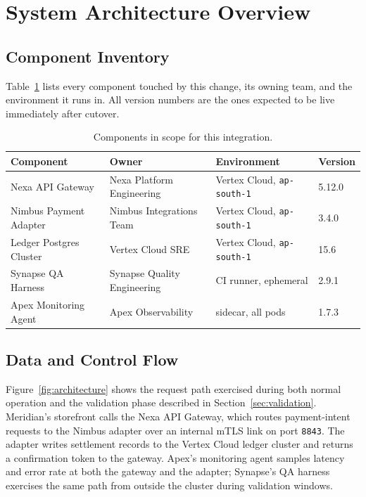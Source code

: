 \section{System Architecture Overview}

\subsection{Component Inventory}
Table~\ref{tab:components} lists every component touched by this change, its owning team, and
the environment it runs in. All version numbers are the ones expected to be live immediately
after cutover.

\begin{table}[h]
  \centering
  \small
  \begin{tabularx}{\textwidth}{@{}l l l l@{}}
    \toprule
    \textbf{Component} & \textbf{Owner} & \textbf{Environment} & \textbf{Version} \\
    \midrule
    Nexa API Gateway & Nexa Platform Engineering & Vertex Cloud, \texttt{ap-south-1} & 5.12.0 \\
    Nimbus Payment Adapter & Nimbus Integrations Team & Vertex Cloud, \texttt{ap-south-1} & 3.4.0 \\
    Ledger Postgres Cluster & Vertex Cloud SRE & Vertex Cloud, \texttt{ap-south-1} & 15.6 \\
    Synapse QA Harness & Synapse Quality Engineering & CI runner, ephemeral & 2.9.1 \\
    Apex Monitoring Agent & Apex Observability & sidecar, all pods & 1.7.3 \\
    \bottomrule
  \end{tabularx}
  \caption{Components in scope for this integration.}
  \label{tab:components}
\end{table}

\subsection{Data and Control Flow}
Figure~\ref{fig:architecture} shows the request path exercised during both normal operation and
the validation phase described in Section~\ref{sec:validation}. Meridian's storefront calls the
Nexa API Gateway, which routes payment-intent requests to the Nimbus adapter over an internal
mTLS link on port \texttt{8843}. The adapter writes settlement records to the Vertex Cloud
ledger cluster and returns a confirmation token to the gateway. Apex's monitoring agent samples
latency and error rate at both the gateway and the adapter; Synapse's QA harness exercises the
same path from outside the cluster during validation windows.

